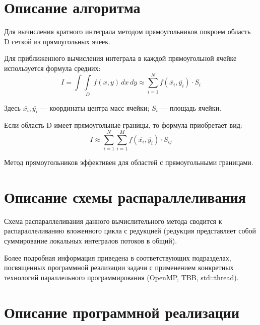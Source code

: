 \documentclass{article}
\begin{document}
\newpage

\section{Описание алгоритма}

\par Для вычисления кратного интеграла методом прямоугольников покроем область D сеткой из прямоугольных ячеек.

\par Для приближенного вычисления интеграла в каждой прямоугольной ячейке используется формула средних:
\begin{equation}
I = \int\int\limits_D \, f(x,y) \,dx\,dy \approx \sum_{i=1}^{N} f(\overline{x_{i}}, \overline{y_{i}}) \cdot S_i
\end{equation}

\par Здесь $\overline{x_{i}}, \overline{y_{i}}$ — координаты центра масс ячейки; $S_i$ — площадь ячейки.

\par Если область D имеет прямоугольные границы, то формула приобретает вид:
\begin{equation}
I \approx \sum_{i=1}^{N} \sum_{i=1}^{M} f(\overline{x_{i}}, \overline{y_{i}}) \cdot S_{ij}
\end{equation}

\par Метод прямоугольников эффективен для областей с прямоугольными границами.

\newpage

\section{Описание схемы распараллеливания}

\par Схема распараллеливания данного вычислительного метода сводится к распараллеливанию вложенного цикла с редукцией (редукция представляет собой суммирование локальных интегралов потоков в общий). 

\par Более подробная информация приведена в соответствующих подразделах, посвященных программной реализации задачи с применением конкретных технологий параллельного программирования (OpenMP, TBB, std::thread).

\newpage

\section{Описание программной реализации}
\end{document}
